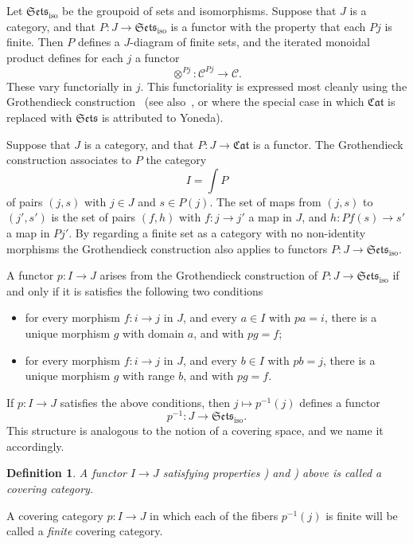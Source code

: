 \documentclass{amsart}
\newtheorem{definition}[equation]{Definition}
\newenvironment{defin}{\begin{definition}\rm}{\end{definition}}
\theoremstyle{definition}
\newtheorem{defin}[equation]{Definition}
\theoremstyle{remark}
\newcommand{\thmListItem}[1]{\rm \romannumeral#1)}
\newcommand{\cat}[1]{{\mathcal #1}}
\newcommand{\categories}{\mathfrak{Cat}}
\newcommand{\isosets}{\mathfrak{Sets}_{\text{iso}}}
\begin{document}
Let $\isosets$ be the groupoid of sets and isomorphisms.  Suppose that
$J$ is a category, and that $P:J\to \isosets$ is a functor with the
property that each $Pj$ is finite.  Then $P$ defines a $J$-diagram of
finite sets, and the iterated monoidal product defines for each $j$ a
functor
\begin{equation}
\label{eq:22}
\otimes^{Pj}:\cat C^{Pj}\to \cat C.
\end{equation}
These vary functorially in $j$.  This functoriality is expressed most
cleanly using the Grothendieck
construction~\cite[\S{}VI.8]{MR2017446} (see also~\cite[\S{}B.1]{MR1953060},
or \cite[p.~44]{MR1300636} where the special case in which
$\mathfrak{Cat}$ is replaced with $\mathfrak{Sets}$ is attributed to
Yoneda).

Suppose that $J$ is a category, and that $P:J\to \categories$ is a
functor.  The Grothendieck construction associates to $P$ the category 
\[
I=\int P
\]
of pairs $(j,s)$ with $j\in J$ and $s\in P(j)$.  The set of maps from
$(j,s)$ to $(j',s')$ is the set of pairs $(f,h)$ with $f:j\to j'$ a
map in $J$, and $h:Pf(s)\to s'$ a map in $Pj'$.  By regarding a finite
set as a category with no non-identity morphisms the Grothendieck
construction also applies to functors $P:J\to\isosets$.

A functor $p:I\to J$ arises from the Grothendieck construction of
$P:J\to\isosets$ if and only if it is satisfies the following two
conditions
\begin{itemize}
\item[i)] for every morphism $f:i\to j$ in $J$, and every $a\in I$ with
$pa=i$, there is a unique morphism $g$ with domain $a$, and with $pg=f$;
\item[ii)] for every morphism $f:i\to j$ in $J$, and every $b\in I$ with
$pb=j$, there is a unique morphism $g$ with range $b$, and with $pg=f$.
\end{itemize}
If $p:I\to J$ satisfies the above conditions, then $j\mapsto
p^{-1}(j)$ defines a functor
\[
p^{-1}:J\to\isosets.
\]
This structure is analogous
to the notion of a covering space, and we name it accordingly.

\begin{defin}
A functor $I\to J$ satisfying properties \thmListItem{1} and \thmListItem{2} above is
called a {\em covering category}.
\end{defin}

A covering category $p:I\to J$ in which each of the fibers $p^{-1}(j)$
is finite will be called a {\em finite} covering category.
\end{document}
